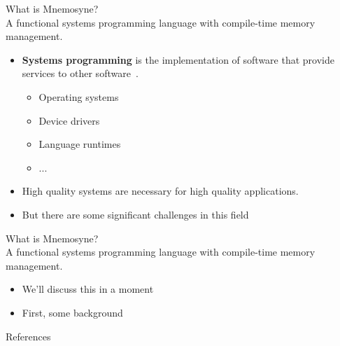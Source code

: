 \documentclass{beamer}
\begin{document}
\begin{frame}
\huge What is Mnemosyne? \normalsize \\
A functional \alert<1->{systems programming} language with compile-time memory management.
\begin{itemize}
\item<1->
    \textbf{Systems programming} is the implementation of software that provide services to other software~\cite{Narten:2003:SP:1074100.1074850,Shapiro:2006:PLC:1215995.1216004}.
    \begin{itemize}
        \item<2->{Operating systems}
        \item<2->{Device drivers}
        \item<2->{Language runtimes}
        \item<2->...
    \end{itemize}
    \item <3-> High quality systems are necessary for high quality applications.
\item <4-> But there are some significant challenges in this field~\cite{whyrust,Shapiro:2006:PLC:1215995.1216004}
\end{itemize}
\end{frame}

\begin{frame}
\huge What is Mnemosyne? \normalsize \\
A functional systems programming language with \alert<1->{compile-time memory management}.
\begin{itemize}
    \item<1-> We'll discuss this in a moment
    \item<1-> First, some background
\end{itemize}
\end{frame}


\begin{frame}
    \huge References \normalsize \\

    \printbibliography
\end{frame}
\end{document}
